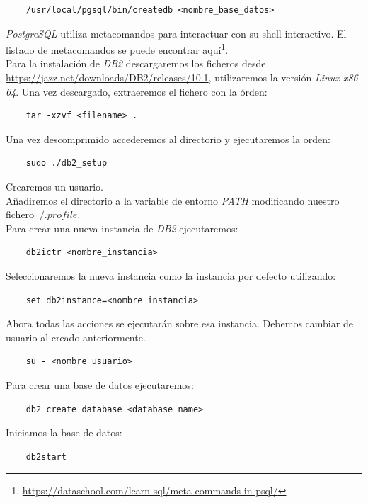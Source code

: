 \documentclass{article}
\begin{document}
\begin{lstlisting}
    /usr/local/pgsql/bin/createdb <nombre_base_datos>
\end{lstlisting}

\emph{PostgreSQL} utiliza metacomandos para interactuar con su shell interactivo. El listado de metacomandos se puede encontrar aquí\footnote{\url{https://dataschool.com/learn-sql/meta-commands-in-psql/}}.\\

Para la instalación de \emph{DB2} descargaremos los ficheros desde \url{https://jazz.net/downloads/DB2/releases/10.1}, utilizaremos la versión \emph{Linux x86-64}. Una vez descargado, extraeremos el fichero con la órden:

\begin{lstlisting}
    tar -xzvf <filename> .
\end{lstlisting}

Una vez descomprimido accederemos al directorio y ejecutaremos la orden:

\begin{lstlisting}
    sudo ./db2_setup
\end{lstlisting}

Crearemos un usuario.\\
Añadiremos el directorio a la variable de entorno \emph{PATH} modificando nuestro fichero $~/.profile$.\\
Para crear una nueva instancia de \emph{DB2} ejecutaremos:

\begin{lstlisting}
    db2ictr <nombre_instancia>
\end{lstlisting}

Seleccionaremos la nueva instancia como la instancia por defecto utilizando:

\begin{lstlisting}
    set db2instance=<nombre_instancia>
\end{lstlisting}

Ahora todas las acciones se ejecutarán sobre esa instancia.
Debemos cambiar de usuario al creado anteriormente.
\begin{lstlisting}
    su - <nombre_usuario>
\end{lstlisting}

Para crear una base de datos ejecutaremos:
\begin{lstlisting}
    db2 create database <database_name>
\end{lstlisting}

Iniciamos la base de datos:
\begin{lstlisting}
    db2start
\end{lstlisting}
\end{document}

